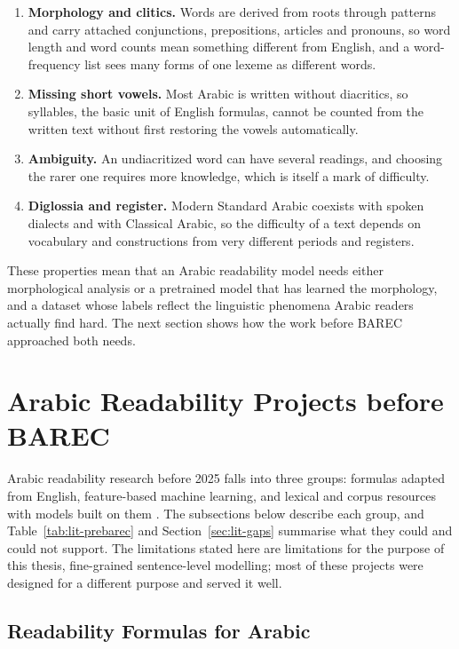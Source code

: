 \begin{enumerate}
\item \textbf{Morphology and clitics.} Words are derived from roots through patterns and carry
attached conjunctions, prepositions, articles and pronouns, so word length and word counts mean
something different from English, and a word-frequency list sees many forms of one lexeme as
different words.
\item \textbf{Missing short vowels.} Most Arabic is written without diacritics, so syllables,
the basic unit of English formulas, cannot be counted from the written text without first
restoring the vowels automatically.
\item \textbf{Ambiguity.} An undiacritized word can have several readings, and choosing the
rarer one requires more knowledge, which is itself a mark of difficulty.
\item \textbf{Diglossia and register.} Modern Standard Arabic coexists with spoken dialects and
with Classical Arabic, so the difficulty of a text depends on vocabulary and constructions from
very different periods and registers.
\end{enumerate}

These properties mean that an Arabic readability model needs either morphological analysis or a
pretrained model that has learned the morphology, and a dataset whose labels reflect the
linguistic phenomena Arabic readers actually find hard. The next section shows how the work
before BAREC approached both needs.

\section{Arabic Readability Projects before BAREC}
\label{sec:lit-prebarec}

Arabic readability research before 2025 falls into three groups: formulas adapted from English,
feature-based machine learning, and lexical and corpus resources with models built on them
\cite{nassiri2023approaches,elmadani2025barec}. The subsections below describe each group, and
Table~\ref{tab:lit-prebarec} and Section~\ref{sec:lit-gaps} summarise what they could and could
not support. The limitations stated here are limitations for the purpose of this thesis,
fine-grained sentence-level modelling; most of these projects were designed for a different
purpose and served it well.

\subsection{Readability Formulas for Arabic}


